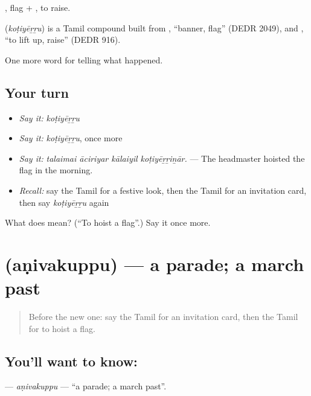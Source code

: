 , flag + , to raise.

\begin{cousinweb}
\textbf{} (\emph{koṭiyēṟṟu}) is a Tamil compound built from , \textquotedblleft{}banner, flag\textquotedblright{} (DEDR 2049), and , \textquotedblleft{}to lift up, raise\textquotedblright{} (DEDR 916).
\end{cousinweb}

\begin{grammarlens}[title={What you've built}]
One more word for telling what happened.
\end{grammarlens}

\subsection*{Your turn}
\begin{itemize}
\raggedright
  \item \emph{Say it:} \emph{koṭiyēṟṟu}
  \item \emph{Say it:} \emph{koṭiyēṟṟu}, once more
  \item \emph{Say it:} \emph{talaimai āciriyar kālaiyil koṭiyēṟṟiṉār.} — The headmaster hoisted the flag in the morning.
  \item \emph{Recall:} say the Tamil for a festive look, then the Tamil for an invitation card, then say \emph{koṭiyēṟṟu} again
\end{itemize}

\begin{tcolorbox}[breakable,colback=teal!4,colframe=teal!35!black,title={Before you move on}]
What does  mean? (\textquotedblleft{}To hoist a flag\textquotedblright{}.) Say it once more.
\end{tcolorbox}
\section[\texorpdfstring{\ta{அணிவகுப்பு} (aṇivakuppu)}{அணிவகுப்பு (aṇivakuppu)}]{ (aṇivakuppu) — a parade; a march past}

\label{lesson:TA-C320-anivakuppu}



\begin{quote}
Before the new one: say the Tamil for an invitation card, then the Tamil for to hoist a flag.
\end{quote}

\subsection*{You'll want to know: }
\textbf{} — \emph{aṇivakuppu} — \textquotedblleft{}a parade; a march past\textquotedblright{}.

